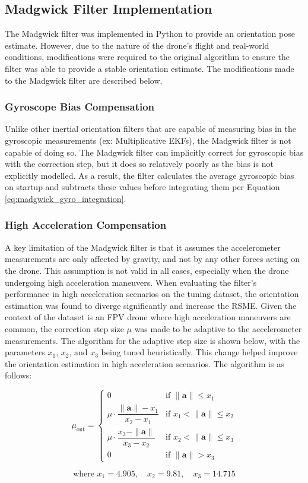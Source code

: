 \documentclass[bare_jrnl_transmag]{subfiles}
\begin{document}
\subsection{Madgwick Filter Implementation}
The Madgwick filter was implemented in Python to provide an orientation pose estimate. However, due to the nature of the drone's flight and real-world conditions, modifications were required to the original algorithm to ensure the filter was able to provide a stable orientation estimate. The modifications made to the Madgwick filter are described below.

\subsubsection{Gyroscope Bias Compensation}
Unlike other inertial orientation filters that are capable of measuring bias in the gyroscopic measurements (ex: Multiplicative EKFs), the Madgwick filter is not capable of doing so. The Madgwick filter can implicitly correct for gyroscopic bias with the correction step, but it does so relatively poorly as the bias is not explicitly modelled. As a result, the filter calculates the average gyroscopic bias on startup and subtracts these values before integrating them per Equation \ref{eq:madgwick_gyro_integration}.

\subsubsection{High Acceleration Compensation}
A key limitation of the Madgwick filter is that it assumes the accelerometer measurements are only affected by gravity, and not by any other forces acting on the drone. This assumption is not valid in all cases, especially when the drone undergoing high acceleration maneuvers. When evaluating the filter's performance in high acceleration scenarios on the tuning dataset, the orientation estimation was found to diverge significantly and increase the RSME. Given the context of the dataset is an FPV drone where high acceleration maneuvers are common, the correction step size $\mu$ was made to be adaptive to the accelerometer measurements. The algorithm for the adaptive step size is shown below, with the parameters $x_1$, $x_2$, and $x_3$ being tuned heuristically. This change helped improve the orientation estimation in high acceleration scenarios. The algorithm is as follows:

\[
\mu_{\text{out}} =
\begin{cases}
0 & \text{if } \|\mathbf{a}\| \leq x_1 \\
\mu \cdot \dfrac{\|\mathbf{a}\| - x_1}{x_2 - x_1} & \text{if } x_1 < \|\mathbf{a}\| \leq x_2 \\
\mu \cdot \dfrac{x_3 - \|\mathbf{a}\|}{x_3 - x_2} & \text{if } x_2 < \|\mathbf{a}\| \leq x_3 \\
0 & \text{if } \|\mathbf{a}\| > x_3
\end{cases}
\]

\[
\text{where } x_1 = 4.905, \quad x_2 = 9.81, \quad x_3 = 14.715
\]
\end{document}
